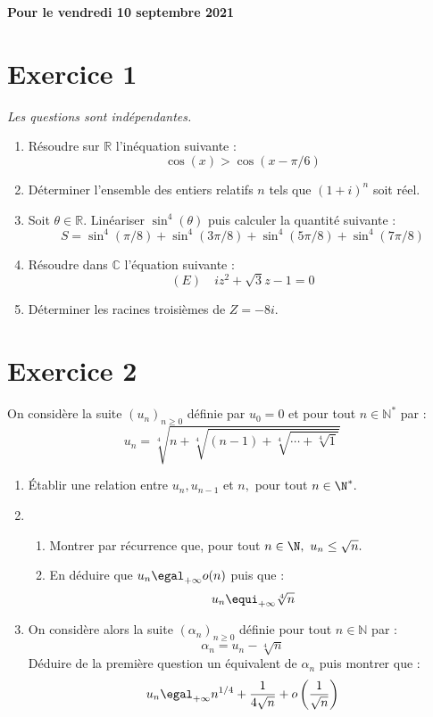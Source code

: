 \documentclass[a4paper,french,11pt,twoside]{VcCours}
\begin{document}
\begin{center}
\large\bf 
Pour le vendredi 10 septembre 2021
\end{center}
\separationTitre


\section*{Exercice 1}

\emph{Les questions sont indépendantes.}

\begin{enumerate}
\item Résoudre sur $\mathbb{R}$ l'inéquation suivante :
$$ \cos(x) > \cos(x-\pi/6)$$
\item Déterminer l'ensemble des entiers relatifs $n$ tels que $(1+i)^n$ 
soit réel.
\item Soit $\theta \in \mathbb{R}$. Linéariser $\sin^4(\theta)$ puis calculer 
la quantité suivante :
$$ S = \sin^4(\pi/8)+ \sin^4(3\pi/8) + \sin^4(5\pi/8) + \sin^4(7\pi/8)$$
\item Résoudre dans $\mathbb{C}$ l'équation suivante :
$$ (E) \quad i z^2+ \sqrt{3}z-1=0$$
\item Déterminer les racines troisièmes de $Z=-8i$.
\end{enumerate}


\section*{Exercice 2}
On considère la suite $(u_n)_{n \geq 0}$ définie par $u_0=0$ et pour tout 
$n \in \mathbb{N}^*$ par :
$$ u_n=\sqrt[4]{n+\sqrt[4]{(n-1)+\sqrt[4]{\cdots+\sqrt[4]{1}}}}$$

\begin{enumerate}
\item Établir une relation entre $u_n, u_{n-1}$ et $n,$ pour tout
$n\in\N^*.$
\item\begin{enumerate}
\item Montrer par récurrence que, pour tout $n\in\N, \ u_n\leq
\sqrt{n}.$
\item En déduire que $u_n\egal_{+\infty}o(n)$ puis que : 
$$u_n \equi_{+\infty}\sqrt[4]{n}$$
\end{enumerate}
\item On considère alors la suite $(\alpha_n)_{n \geq 0}$
définie pour tout $n \in \mathbb{N}$ par :
$$ \alpha_n=u_n-\sqrt[4]{n}$$
Déduire de la première question un équivalent de $\alpha_n$ puis montrer que :
$$u_n \egal_{+\infty}n^{1/4}+\frac{1}{4\sqrt{n}}+o\left(\frac{1}{\sqrt{n}}\right) $$
\end{enumerate}
\end{document}
